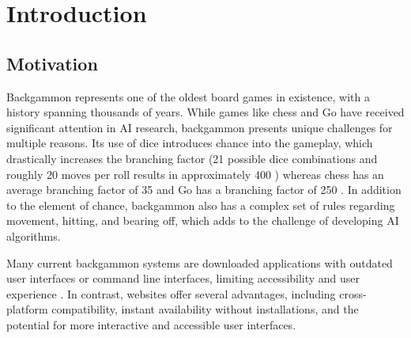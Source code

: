 \chapter{Introduction}
\label{cha:intro}
\section{Motivation}
Backgammon represents one of the oldest board games in existence, with a history spanning thousands of years. While games like chess and Go have received significant attention in AI research, backgammon presents unique challenges for multiple reasons. Its use of dice introduces chance into the gameplay, which drastically increases the branching factor (21 possible dice combinations and roughly 20 moves per roll results in approximately 400 \cite{branchingfactor}) whereas chess has an average branching factor of 35 and Go has a branching factor of 250 \cite{mctsbranching}. In addition to the element of chance, backgammon also has a complex set of rules regarding movement, hitting, and bearing off, which adds to the challenge of developing AI algorithms.

Many current backgammon systems are downloaded applications with outdated user interfaces or command line interfaces, limiting accessibility and user experience \cite{gnubg}. In contrast, websites offer several advantages, including cross-platform compatibility, instant availability without installations, and the potential for more interactive and accessible user interfaces.


